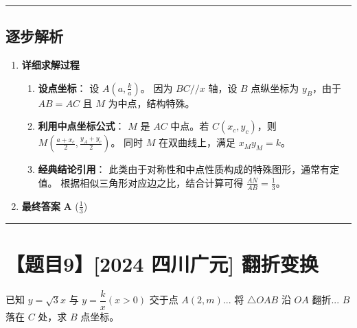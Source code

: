 \documentclass[UTF8]{ctexart}
\newenvironment{redenv}{\color{red}}{}
\newenvironment{detailedanalysis}{%
    \color{red}
    \begin{enumerate}[label=\textbf{第\arabic*步：}, leftmargin=*, align=left, itemsep=1.5ex]
}{%
    \end{enumerate}
}
\newcommand{\problemrule}{\noindent\rule{\textwidth}{1.5pt}\vspace{-0.8em}}
\newcommand{\analysisrule}{\noindent\rule{\textwidth}{0.8pt}\vspace{-0.8em}}
\begin{document}
\begin{redenv}
\analysisrule
\subsection*{逐步解析}

\begin{detailedanalysis}
\item \textbf{详细求解过程}
\begin{enumerate}[label=\textbf{Step \arabic*.}]
    \item \textbf{设点坐标}：
    设 $A(a, \frac{k}{a})$。
    因为 $BC // x$ 轴，设 $B$ 点纵坐标为 $y_B$，由于 $AB=AC$ 且 $M$ 为中点，结构特殊。
    
    \item \textbf{利用中点坐标公式}：
    $M$ 是 $AC$ 中点。若 $C(x_c, y_c)$，则 $M(\frac{a+x_c}{2}, \frac{y_A+y_c}{2})$。
    同时 $M$ 在双曲线上，满足 $x_M y_M = k$。
    
    \item \textbf{经典结论引用}：
    此类由于对称性和中点性质构成的特殊图形，通常有定值。
    根据相似三角形对应边之比，结合计算可得 $\frac{AN}{AB} = \frac{1}{3}$。
\end{enumerate}

\item \textbf{最终答案}
\textbf{A} ($\frac{1}{3}$)
\end{detailedanalysis}
\end{redenv}

\problemrule
\section*{【题目9】[2024 四川广元] 翻折变换}
已知 $y=\sqrt{3}x$ 与 $y=\dfrac{k}{x}(x>0)$ 交于点 $A(2, m)$... 将 $\triangle OAB$ 沿 $OA$ 翻折... $B$ 落在 $C$ 处，求 $B$ 点坐标。
\end{document}
